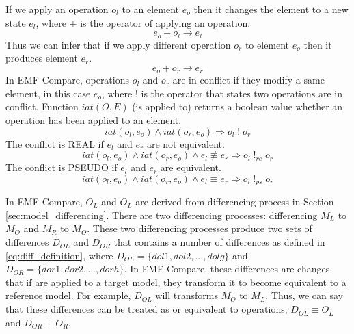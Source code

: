If we apply an operation $o_{l}$ to an element $e_{o}$ then it changes the element to a new state $e_{l}$, where $+$ is the operator of applying an operation.
\begin{equation} \label{eq:conflict_1.1}
e_{o} + o_{l}  \rightarrow e_{l}
\end{equation}
Thus we can infer that if we apply different operation $o_{r}$ to element $e_{o}$ then it produces element $e_{r}$. 
\begin{equation} \label{eq:conflict_1.2}
e_{o} + o_{r}  \rightarrow e_{r}
\end{equation}
In EMF Compare, operations $o_{l}$ and $o_{r}$ are in conflict if they modify a same element, in this case $e_{o}$, where $!$ is the operator that states two operations are in conflict. Function $iat(O, E)$ (is applied to) returns a boolean value whether an operation has been applied to an element.
\begin{equation} \label{eq:conflict_1.3}
iat(o_{l}, e_{o}) \wedge iat(o_{r}, e_{o}) \Rightarrow o_{l}\;!\;o_{r}
\end{equation} 
The conflict is \textsf{REAL} if $e_{l}$ and $e_{r}$ are not equivalent.
\begin{equation} \label{eq:conflict_1.4}
iat(o_{l}, e_{o}) \wedge iat(o_{r}, e_{o}) \wedge e_{l} \not\equiv e_{r} \Rightarrow o_{l}\;!_{re}\;o_{r}
\end{equation}
The conflict is \textsf{PSEUDO} if $e_{l}$ and $e_{r}$ are equivalent.
\begin{equation} \label{eq:conflict_1.5}
iat(o_{l}, e_{o}) \wedge iat(o_{r}, e_{o}) \wedge e_{l} \equiv e_{r} \Rightarrow o_{l}\;!_{ps}\;o_{r}
\end{equation} 

In EMF Compare, $O_{L}$ and $O_{L}$ are derived from differencing process in Section \ref{sec:model_differencing}. There are two differencing processes: differencing $M_{L}$ to $M_{O}$ and $M_{R}$ to $M_{O}$. These two differencing processes produce two sets of differences $D_{OL}$ and $D_{OR}$ that contains a number of differences as defined in \ref{eq:diff_definition}, where $D_{OL} = \{dol1, dol2, ..., dolg\}$ and $D_{OR} = \{dor1, dor2, ..., dorh\}$. In EMF Compare, these differences are changes that if are applied to a target model, they transform it to become equivalent to a reference model. For example, $D_{OL}$ will transforms $M_{O}$ to $M_{L}$. Thus, we can say that these differences can be treated as or equivalent to operations;  $D_{OL} \equiv O_{L}$ and $D_{OR} \equiv O_{R}$.

